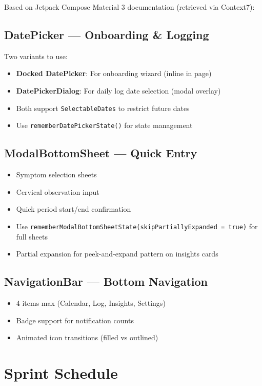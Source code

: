 \documentclass[12pt,a4paper]{article}
\begin{document}
Based on Jetpack Compose Material 3 documentation (retrieved via Context7):

\subsection{DatePicker — Onboarding \& Logging}
Two variants to use:
\begin{itemize}[leftmargin=1.5em]
  \item \textbf{Docked DatePicker}: For onboarding wizard (inline in page)
  \item \textbf{DatePickerDialog}: For daily log date selection (modal overlay)
  \item Both support \texttt{SelectableDates} to restrict future dates
  \item Use \texttt{rememberDatePickerState()} for state management
\end{itemize}

\subsection{ModalBottomSheet — Quick Entry}
\begin{itemize}[leftmargin=1.5em]
  \item Symptom selection sheets
  \item Cervical observation input
  \item Quick period start/end confirmation
  \item Use \texttt{rememberModalBottomSheetState(skipPartiallyExpanded = true)} for full sheets
  \item Partial expansion for peek-and-expand pattern on insights cards
\end{itemize}

\subsection{NavigationBar — Bottom Navigation}
\begin{itemize}[leftmargin=1.5em]
  \item 4 items max (Calendar, Log, Insights, Settings)
  \item Badge support for notification counts
  \item Animated icon transitions (filled vs outlined)
\end{itemize}

\section{Sprint Schedule}
\end{document}
